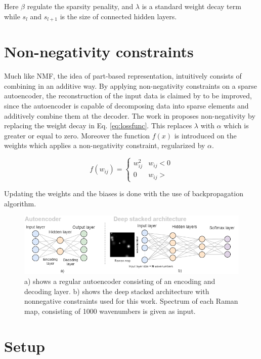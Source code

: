\documentclass{article}
\begin{document}
Here $\beta$ regulate the sparsity penality, and $\lambda$ is a standard weight decay term while $s_l$ and $s_{l+1}$ is the size of connected hidden layers. 

\section{Non-negativity constraints}
\label{sec:prior}

Much like NMF, the idea of part-based representation, intuitively consists of combining in an additive way. By applying non-negativity constraints on a sparse autoencoder, the reconstruction of the input data is claimed by \cite{Hosseini-Asl2016} to be improved, since the autoencoder is capable of decomposing data into sparse elements and additively combine them at the decoder. The work in \cite{Hosseini-Asl2016} proposes non-negativity by replacing the weight decay in Eq. \eqref{eq:lossfunc}. This replaces $\lambda$ with $\alpha$ which is greater or equal to zero. Moreover the function $f(x)$ is introduced on the weights which applies a non-negativity constraint, regularized by $\alpha$. 

\begin{equation}
f(w_{ij}) = \begin{cases}
  w_{ij}^2 & w_{ij} < 0 \\
  0 & w_{ij} >
\end{cases} 
\end{equation}\label{eq:non_neg}

Updating the weights and the biases is done with the use of backpropagation algorithm. 


\begin{figure}[!h]
  \includegraphics[width=1\textwidth]{figures_4/setup_diagram.png}
  \caption{a) shows a regular autoencoder consisting of an encoding and decoding layer. b) shows the deep stacked architecture with nonnegative constraints used for this work. Spectrum of each Raman map, consisting of 1000 wavenumbers is given as input. }\label{fig:setup}
\end{figure}

\section{Setup}
\label{sec:setup}
\end{document}
